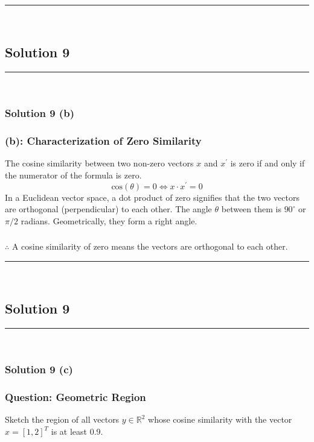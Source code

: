 \documentclass{article}
\begin{document}
\noindent\rule{\textwidth}{0.4pt}\\

\newpage

\subsection*{Solution 9}
\noindent\rule{\textwidth}{0.4pt}\\
\subsubsection*{Solution 9 (b)}
\subsubsection*{(b): Characterization of Zero Similarity}
\parbox{\textwidth}{
The cosine similarity between two non-zero vectors $x$ and $x^{\prime}$ is zero if and only if the numerator of the formula is zero.
$$ \text{cos}(\theta) = 0 \iff x \cdot x^{\prime} = 0 $$
In a Euclidean vector space, a dot product of zero signifies that the two vectors are orthogonal (perpendicular) to each other. The angle $\theta$ between them is $90^\circ$ or $\pi/2$ radians. Geometrically, they form a right angle.
}
\subsubsection*{\normalfont}{$\therefore$ A cosine similarity of zero means the vectors are orthogonal to each other.}

\noindent\rule{\textwidth}{0.4pt}\\

\newpage
\subsection*{Solution 9}
\noindent\rule{\textwidth}{0.4pt}\\
\subsubsection*{Solution 9 (c)}

\subsubsection*{Question: Geometric Region}
Sketch the region of all vectors $y \in \mathbb{R}^2$ whose cosine similarity with the vector $x = [1, 2]^T$ is at least 0.9.
\end{document}
